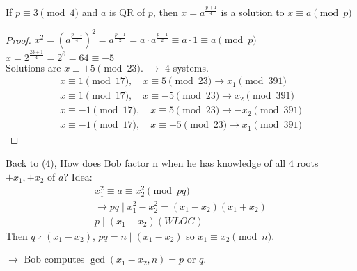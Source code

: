     If $p\equiv 3\pmod{4}$ and $a$ is QR of $p$, then $x=a^{\frac{p+1}{4}}$ is a solution to $x\equiv a\pmod{p}$
    
    \begin{proof}
        $x^2=(a^{\frac{p+1}{4}})^2 = a^{\frac{p+1}{2}} = a\cdot a^{\frac{p-1}{2}} \equiv a\cdot 1 \equiv a\pmod{p}$ \\
        $x = 2^{\frac{23+1}{4}} = 2^6 = 64 \equiv -5$ \\

        Solutions are $x\equiv \pm 5\pmod{23}$. 
        $\rightarrow$ 4 systems. 
        \begin{align*}
            x\equiv 1\pmod{17},\quad x\equiv 5\pmod{23} \rightarrow x_1\pmod{391} \\
            x\equiv 1\pmod{17},\quad x\equiv -5\pmod{23} \rightarrow x_2\pmod{391} \\
            x\equiv -1\pmod{17},\quad x\equiv 5\pmod{23} \rightarrow -x_2\pmod{391} \\
            x\equiv -1\pmod{17},\quad x\equiv -5\pmod{23} \rightarrow x_1\pmod{391} 
        \end{align*}
    \end{proof}

    Back to (4), How does Bob factor n when he has knowledge of all 4 roots 
    $\pm x_1, \pm x_2$ of $a$?
    Idea: 
    \begin{align*}
        x_1^2\equiv a\equiv x_2^2\pmod{pq} \\
        \rightarrow pq\mid x_1^2 - x_2^2 = (x_1 - x_2)(x_1 + x_2) \\
        p\mid (x_1 - x_2)(WLOG)
    \end{align*}
    Then $q\nmid (x_1-x_2)$, $pq=n\mid (x_1-x_2)$  so $x_1\equiv x_2\pmod{n}$. 

    $\rightarrow$ Bob computes $\gcd(x_1 - x_2, n) = p$ or $q$. 